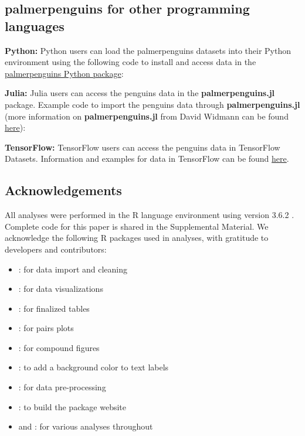 \hypertarget{palmerpenguins-for-other-programming-languages}{%
\subsection{palmerpenguins for other programming
languages}\label{palmerpenguins-for-other-programming-languages}}

\textbf{Python:} Python users can load the palmerpenguins datasets into
their Python environment using the following code to install and access
data in the
\href{https://pypi.org/project/palmerpenguins/}{palmerpenguins Python
package}:

\textbf{Julia:} Julia users can access the penguins data in the
\textbf{palmerpenguins.jl} package. Example code to import the penguins
data through \textbf{palmerpenguins.jl} (more information on
\textbf{palmerpenguins.jl} from David Widmann can be found
\href{https://github.com/devmotion/palmerpenguins.jl}{here}):

\textbf{TensorFlow:} TensorFlow users can access the penguins data in
TensorFlow Datasets. Information and examples for  data
in TensorFlow can be found
\href{https://www.tensorflow.org/datasets/catalog/penguins}{here}.

\hypertarget{acknowledgements}{%
\subsection{Acknowledgements}\label{acknowledgements}}

All analyses were performed in the R language environment using version
3.6.2 \citep{r_core_team_r_2019}. Complete code for this paper is shared
in the Supplemental Material. We acknowledge the following R packages
used in analyses, with gratitude to developers and contributors:

\begin{itemize}
\tightlist
\item
   \citep{wickham_welcome_2019}: for data import and
  cleaning
\item
   \citep{wickham_ggplot2_2016}: for data
  visualizations
\item
   \citep{zhu_kableextra_2019}: for finalized tables
\item
   \citep{schloerke_ggally_2020}: for pairs plots
\item
   \citep{pedersen_patchwork_2019}: for compound
  figures
\item
   \citep{yu_shadowtext_2019}: to add a background
  color to text labels
\item
   \citep{kuhn_recipes_2020}: for data pre-processing
\item
   \citep{wickham_pkgdown_2020}: to build the package
  website
\item
   and : for various analyses throughout
\end{itemize}

